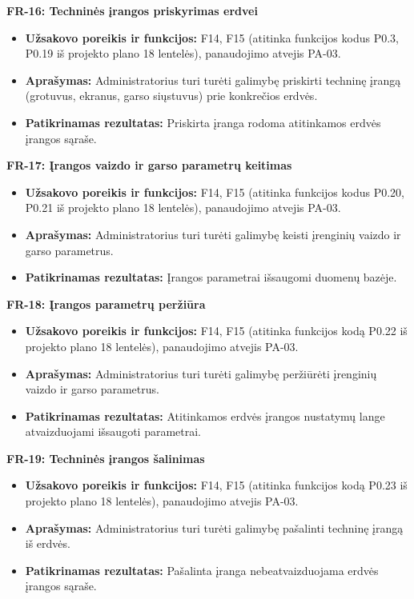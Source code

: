 \vspace{0.3cm}
\noindent\textbf{FR-16: Techninės įrangos priskyrimas erdvei}
\begin{itemize}
    \item \textbf{Užsakovo poreikis ir funkcijos:} F14, F15 (atitinka funkcijos kodus P0.3, P0.19 iš projekto plano 18 lentelės), panaudojimo atvejis PA-03.
    \item \textbf{Aprašymas:} Administratorius turi turėti galimybę priskirti techninę įrangą (grotuvus, ekranus, garso siųstuvus) prie konkrečios erdvės.
    \item \textbf{Patikrinamas rezultatas:} Priskirta įranga rodoma atitinkamos erdvės įrangos sąraše.
\end{itemize}

\vspace{0.3cm}
\noindent\textbf{FR-17: Įrangos vaizdo ir garso parametrų keitimas}
\begin{itemize}
    \item \textbf{Užsakovo poreikis ir funkcijos:} F14, F15 (atitinka funkcijos kodus P0.20, P0.21 iš projekto plano 18 lentelės), panaudojimo atvejis PA-03.
    \item \textbf{Aprašymas:} Administratorius turi turėti galimybę keisti įrenginių vaizdo ir garso parametrus.
    \item \textbf{Patikrinamas rezultatas:} Įrangos parametrai išsaugomi duomenų bazėje.
\end{itemize}

\vspace{0.3cm}
\noindent\textbf{FR-18: Įrangos parametrų peržiūra}
\begin{itemize}
    \item \textbf{Užsakovo poreikis ir funkcijos:} F14, F15 (atitinka funkcijos kodą P0.22 iš projekto plano 18 lentelės), panaudojimo atvejis PA-03.
    \item \textbf{Aprašymas:} Administratorius turi turėti galimybę peržiūrėti įrenginių vaizdo ir garso parametrus.
    \item \textbf{Patikrinamas rezultatas:} Atitinkamos erdvės įrangos nustatymų lange atvaizduojami išsaugoti parametrai.
\end{itemize}

\vspace{0.3cm}
\noindent\textbf{FR-19: Techninės įrangos šalinimas}
\begin{itemize}
    \item \textbf{Užsakovo poreikis ir funkcijos:} F14, F15 (atitinka funkcijos kodą P0.23 iš projekto plano 18 lentelės), panaudojimo atvejis PA-03.
    \item \textbf{Aprašymas:} Administratorius turi turėti galimybę pašalinti techninę įrangą iš erdvės.
    \item \textbf{Patikrinamas rezultatas:} Pašalinta įranga nebeatvaizduojama erdvės įrangos sąraše.
\end{itemize}


